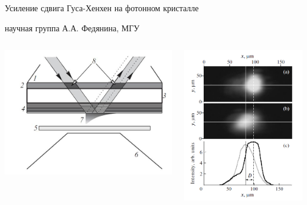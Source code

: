 \documentclass[9pt, compress, xcolor=table]{beamer}
\begin{document}
\begin{frame}{Усиление сдвига Гуса-Хенхен на фотонном кристалле}

 научная группа А.А. Федянина, МГУ
\begin{columns}[c]
\column{2.0in}
\begin{center}
\includegraphics[scale=0.3]{gh4a}
\end{center}
\column{2.0in}
\begin{center}
\includegraphics[scale=0.35]{gh4}
\end{center}


\end{columns}

\end{frame}
\end{document}
